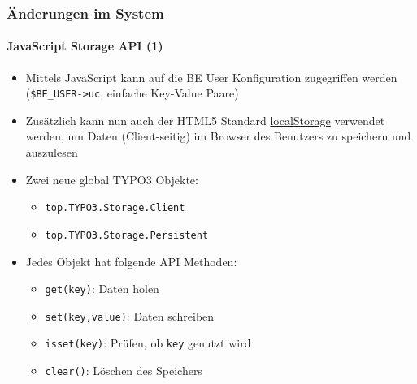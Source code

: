 
\begin{frame}[fragile]
	\frametitle{Änderungen im System}
	\framesubtitle{JavaScript Storage API (1)}

	\begin{itemize}
		\item Mittels JavaScript kann auf die BE User Konfiguration zugegriffen werden (\texttt{\$BE\_USER->uc}, einfache Key-Value Paare)
		\item Zusätzlich kann nun auch der HTML5 Standard \href{http://www.w3.org/TR/webstorage/}{localStorage}
			verwendet werden, um Daten (Client-seitig) im Browser des Benutzers
			zu speichern und auszulesen

		\item Zwei neue global TYPO3 Objekte:
			\begin{itemize}
				\item \texttt{top.TYPO3.Storage.Client}
				\item \texttt{top.TYPO3.Storage.Persistent}
			\end{itemize}

		\item Jedes Objekt hat folgende API Methoden:
			\begin{itemize}
				\item \texttt{get(key)}: Daten holen
				\item \texttt{set(key,value)}: Daten schreiben 
				\item \texttt{isset(key)}: Prüfen, ob \texttt{key} genutzt wird
				\item \texttt{clear()}: Löschen des Speichers
			\end{itemize}

	\end{itemize}

\end{frame}



